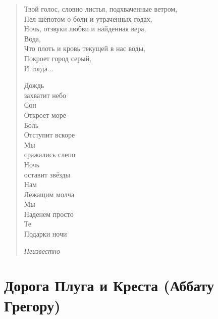 \begin{verse}

Твой голос, словно листья, подхваченные ветром,\\
Пел шёпотом о боли и утраченных годах,\\
Ночь, отзвуки любви и найденная вера,\\
Вода,\\
Что плоть и кровь текущей в нас воды,\\
Покроет город серый,\\
И тогда...


Дождь\\
захватит небо\\
Сон\\
Откроет море\\
Боль\\
Отступит вскоре\\
Мы\\
сражались слепо\\

Ночь\\
оставит звёзды\\
Нам\\
Лежащим молча\\
Мы\\
Наденем просто\\
Те\\
Подарки ночи

\emph{Неизвестно}

\end{verse}

\newpage
\section{Дорога Плуга и Креста (Аббату Грегору)}

